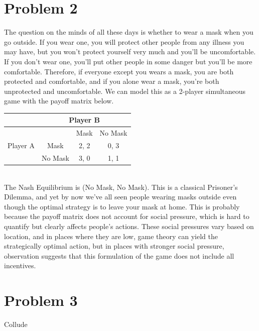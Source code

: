 \documentclass[letterpaper]{article}
\begin{document}
\section{Problem 2}
The question on the minds of all these days is whether to wear a mask when you go outside. If you wear one, you will protect other people from any illness you may have, but you won't protect yourself very much and you'll be uncomfortable. If you don't wear one, you'll put other people in some danger but you'll be more comfortable. Therefore, if everyone except you wears a mask, you are both protected and comfortable, and if you alone wear a mask, you're both unprotected and uncomfortable. We can model this as a 2-player simultaneous game with the payoff matrix below. \\
    \begin{tabular}{|c|c|c|c|}
        \hline
        & \multicolumn{3}{c|}{Player B}       \\ \hline
        \multirow{3}{*}{Player A} & & Mask & No Mask \\ \cline{2-4}
        & Mask  & 2, 2  & 0, 3    \\ \cline{2-4}
        & \multicolumn{1}{c|}{No Mask} & \multicolumn{1}{c|}{3, 0} & 1, 1    \\ \hline
    \end{tabular} \\
    The Nash Equilibrium is (No Mask, No Mask). This is a classical Prisoner's Dilemma, and yet by now we've all seen people wearing masks outside even though the optimal strategy is to leave your mask at home. This is probably because the payoff matrix does not account for social pressure, which is hard to quantify but clearly affects people's actions. These social pressures vary based on location, and in places where they are low, game theory can yield the strategically optimal action, but in places with stronger social pressure, observation suggests that this formulation of the game does not include all incentives.
\section{Problem 3}
Collude
\end{document}
